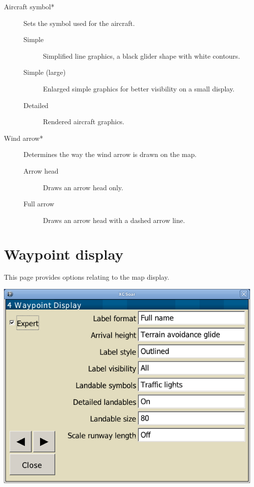 \begin{description}
\item[Aircraft symbol*]  Sets the symbol used for the aircraft.
\begin{description}
 \item[Simple] Simplified line graphics, a black glider shape with white contours.
 \item[Simple (large)] Enlarged simple graphics for better visibility on a small display.
 \item[Detailed] Rendered aircraft graphics.
\end{description}

\item[Wind arrow*]  Determines the way the wind arrow is drawn on the map.
\begin{description}
 \item[Arrow head]  Draws an arrow head only.
 \item[Full arrow]  Draws an arrow head with a dashed arrow line.
\end{description}
\end{description}


\clearpage
\section{Waypoint display}\label{sec:waypoint-display}

This page provides options relating to the map display.

\begin{center}
\includegraphics[angle=0,width=0.8\linewidth,keepaspectratio='true']{figures/config-map_waypoint.png}
\end{center}


